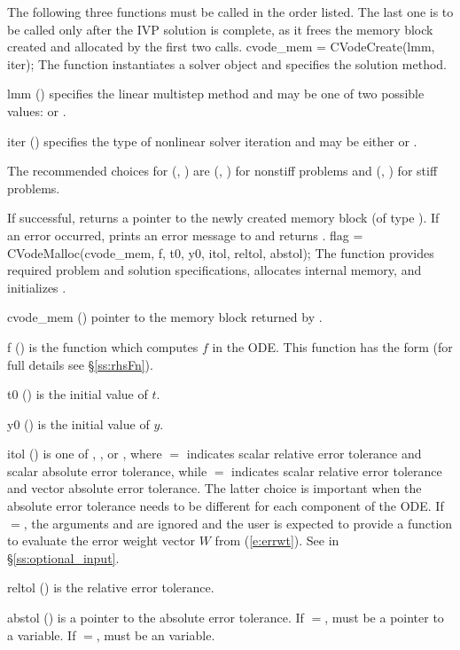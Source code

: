 The following three functions must be called in the order listed. The last one
is to be called only after the IVP solution is complete, as it frees the
{\cvodes} memory block created and allocated by the first two calls.
{
  cvode\_mem = CVodeCreate(lmm, iter);
}
{
  The function  instantiates a {\cvodes} solver object and
  specifies the solution method.
}
{
  \begin{args}[iter]
  \item[lmm] ()
    specifies the linear multistep method and may be one of two
    possible values:  or .     
  \item[iter] ()
    specifies the type of nonlinear solver iteration and may be
    either  or . 
  \end{args}
  The recommended choices for (, ) are
  (, ) for nonstiff problems and
  (, ) for stiff problems.
}
{
  If successful,  returns a pointer to the newly created 
  {\cvodes} memory block (of type ).
  If an error occurred,  prints an error message to 
  and returns .
}
{}
{
flag = CVodeMalloc(cvode\_mem, f, t0, y0, itol, reltol, abstol);
}
{
  The function  provides required problem and solution
  specifications, allocates internal memory, and initializes {\cvodes}.
}
{
  \begin{args}
  \item[cvode\_mem] ()
    pointer to the {\cvodes} memory block returned by .
  \item[f] ()
    is the {\C} function which computes $f$ in the ODE. This function has the 
    form  (for full details see \S\ref{ss:rhsFn}).
  \item[t0] ()
    is the initial value of $t$.
  \item[y0] ()
    is the initial value of $y$. 
  \item[itol] () 
    is one of , , or , where $=$ indicates scalar
    relative error tolerance and scalar absolute error tolerance, while
    $=$ indicates scalar relative error tolerance and vector
    absolute error tolerance.  The latter choice is important when the absolute
    error tolerance needs to be different for each component of the ODE. 
    If $=$, the arguments  and  are ignored
    and the user is expected to provide a function to evaluate the error weight vector
    $W$ from (\ref{e:errwt}). See  in \S\ref{ss:optional_input}.
  \item[reltol] ()
    is the relative error tolerance.
  \item[abstol] ()
    is a pointer to the absolute error tolerance. If $=$, 
    must be a pointer to a  variable. If $=$, 
    must be an  variable.
  \end{args}
}
